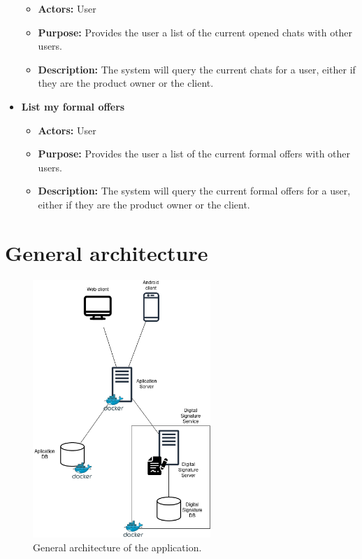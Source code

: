 \documentclass[./main.tex]{subfiles}
\begin{document}
\begin{itemize}
\begin{itemize}
	
	\item
	\textbf{Actors:} User
	\item
	\textbf{Purpose:} Provides the user a list of the current opened chats with other users.
	\item
	\textbf{Description:} The system will query the current chats for a user, either if they are the product owner or the client.
\end{itemize}

\item
\textbf{List my formal offers}

\begin{itemize}
	
	\item
	\textbf{Actors:} User
	\item
	\textbf{Purpose:} Provides the user a list of the current formal offers with other users.
	\item
	\textbf{Description:} The system will query the current formal offers for a user, either if they are the product owner or the client.
\end{itemize}
\end{itemize}

\hypertarget{general-architecture}{%
\section{General architecture}\label{general-architecture}}

\begin{figure}[H]
\centering
\includegraphics[width=0.6\textwidth]{architecture_diagram/Architecture.drawio.png}
\caption{General architecture of the application.}
\end{figure}
\end{document}

